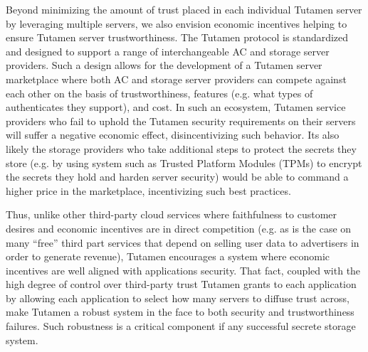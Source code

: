 Beyond minimizing the amount of trust placed in each individual
Tutamen server by leveraging multiple servers, we also envision
economic incentives helping to ensure Tutamen server
trustworthiness. The Tutamen protocol is standardized and designed to
support a range of interchangeable AC and storage server
providers. Such a design allows for the development of a Tutamen
server marketplace where both AC and storage server providers can
compete against each other on the basis of trustworthiness, features
(e.g. what types of authenticates they support), and cost. In such an
ecosystem, Tutamen service providers who fail to uphold the Tutamen
security requirements on their servers will suffer a negative economic
effect, disincentivizing such behavior. Its also likely the storage
providers who take additional steps to protect the secrets they store
(e.g. by using system such as Trusted Platform Modules (TPMs) to
encrypt the secrets they hold and harden server security) would be
able to command a higher price in the marketplace, incentivizing such
best practices.

Thus, unlike other third-party cloud services where faithfulness to
customer desires and economic incentives are in direct competition
(e.g. as is the case on many ``free'' third part services that depend
on selling user data to advertisers in order to generate revenue),
Tutamen encourages a system where economic incentives are well aligned
with applications security. That fact, coupled with the high degree of
control over third-party trust Tutamen grants to each application by
allowing each application to select how many servers to diffuse trust
across, make Tutamen a robust system in the face to both security and
trustworthiness failures. Such robustness is a critical component if
any successful secrete storage system.



